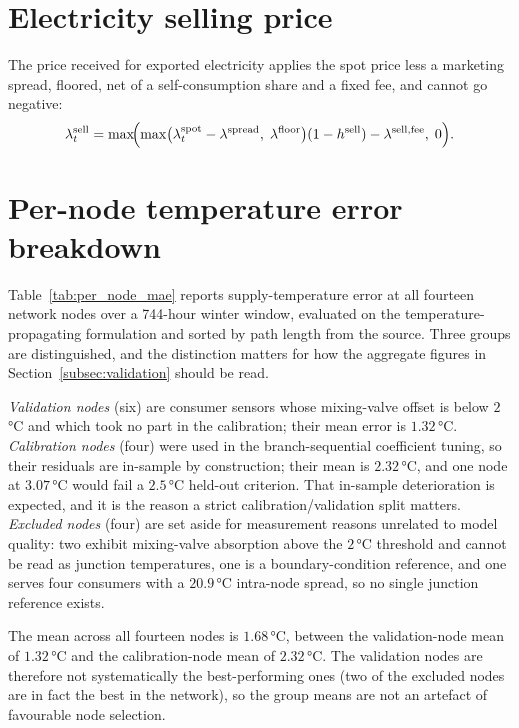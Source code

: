 
\section{Electricity selling price}
\label{app:selling_price}

The price received for exported electricity applies the spot price less a marketing spread,
floored, net of a self-consumption share and a fixed fee, and cannot go negative:
\begin{equation}
  \lambda_t^{\mathrm{sell}} = \max\!\Bigl(
    \max\bigl(\lambda_t^{\mathrm{spot}} - \lambda^{\mathrm{spread}},\;
      \lambda^{\mathrm{floor}}\bigr)
    (1 - h^{\mathrm{sell}})
    - \lambda^{\mathrm{sell,fee}},\; 0\Bigr).
\end{equation}

\section{Per-node temperature error breakdown}
\label{app:per_node_mae}

Table~\ref{tab:per_node_mae} reports supply-temperature error at all fourteen network nodes
over a 744-hour winter window, evaluated on the temperature-propagating formulation and
sorted by path length from the source. Three groups are distinguished, and the distinction
matters for how the aggregate figures in Section~\ref{subsec:validation} should be read.

\emph{Validation nodes} (six) are consumer sensors whose mixing-valve offset is below
$2$\,°C and which took no part in the calibration; their mean error is $1.32$\,°C.
\emph{Calibration nodes} (four) were used in the branch-sequential coefficient tuning, so
their residuals are in-sample by construction; their mean is $2.32$\,°C, and one node at
$3.07$\,°C would fail a $2.5$\,°C held-out criterion. That in-sample deterioration is
expected, and it is the reason a strict calibration/validation split matters.
\emph{Excluded nodes} (four) are set aside for measurement reasons unrelated to model
quality: two exhibit mixing-valve absorption above the $2$\,°C threshold and cannot be read
as junction temperatures, one is a boundary-condition reference, and one serves four
consumers with a $20.9$\,°C intra-node spread, so no single junction reference exists.

The mean across all fourteen nodes is $1.68$\,°C, between the validation-node mean of
$1.32$\,°C and the calibration-node mean of $2.32$\,°C. The validation nodes are therefore
not systematically the best-performing ones (two of the excluded nodes are in fact the
best in the network), so the group means are not an artefact of favourable node selection.

